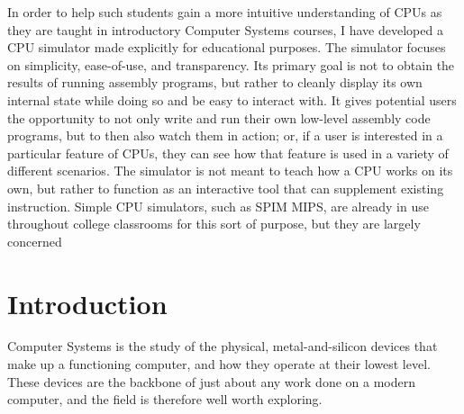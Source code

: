 \documentclass[12pt,twoside]{reedthesis}
\begin{document}
In order to help such students gain a more intuitive understanding of CPUs as they are taught in introductory Computer Systems courses, I have developed a CPU simulator made explicitly for educational purposes.
The simulator focuses on simplicity, ease-of-use, and transparency. Its primary goal is not to obtain the results of running assembly programs, but rather to cleanly display its own internal state while doing so and be easy to interact with.
It gives potential users the opportunity to not only write and run their own low-level assembly code programs, but to then also watch them in action; or, if a user is interested in a particular feature of CPUs, they can see how that feature is used in a variety of different scenarios. The simulator is not meant to teach how a CPU works on its own, but rather to function as an interactive tool that can supplement existing instruction.
Simple CPU simulators, such as SPIM MIPS, are already in use throughout college classrooms for this sort of purpose, but they are largely concerned


\mainmatter %
\pagestyle{fancyplain} %


\chapter*{Introduction}


Computer Systems is the study of the physical, metal-and-silicon devices that make up a functioning computer, and how they operate at their lowest level. These devices are the backbone of just about any work done on a modern computer, and the field is therefore well worth exploring.
\end{document}
